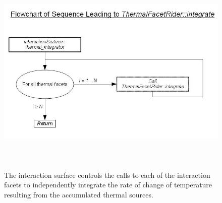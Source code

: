 \begin{figure}[htp]
\begin{center}
\includegraphics[height=4in]{figures/flow_chart_4.jpg}
\caption{The interaction surface controls the calls to each of the
interaction facets to independently integrate the rate of change of
temperature resulting from the accumulated thermal sources.} 
\label{fig:thermalflowchart4}
\end{center}
\end{figure}

